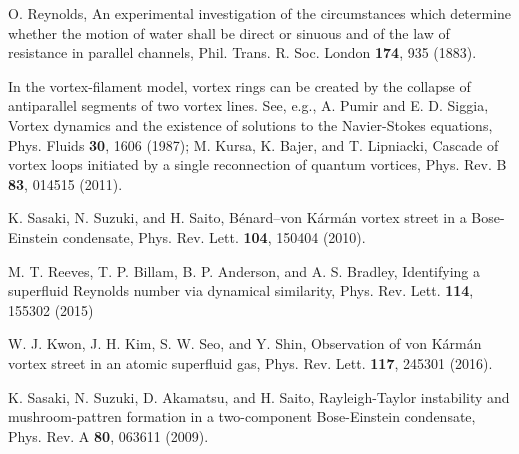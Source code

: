 \documentclass[12pt,a4paper]{jbook}
\begin{document}
\begin{thebibliography}{99}

		O. Reynolds,
		An experimental investigation of the circumstances which determine
		whether the motion of water shall be direct or sinuous
		and of the law of resistance in parallel channels,
		Phil. Trans. R. Soc. London \textbf{174}, 935 (1883).

		In the vortex-filament model, vortex rings can be created by the collapse of 
		antiparallel segments of two vortex lines. See, e.g., A. Pumir and E. D. Siggia,
		Vortex dynamics and the existence of solutions to the Navier-Stokes equations,
		Phys. Fluids \textbf{30}, 1606 (1987); M. Kursa, K. Bajer, and T. Lipniacki, 
		Cascade of vortex loops initiated by a single reconnection of quantum vortices, 
		Phys. Rev. B \textbf{83}, 014515 (2011).

		K. Sasaki, N. Suzuki, and H. Saito,
		B\'enard--von K\'arm\'an vortex street in a Bose-Einstein condensate,
		Phys. Rev. Lett. \textbf{104}, 150404 (2010).

		M. T. Reeves, T. P. Billam, B. P. Anderson, and A. S. Bradley,
		Identifying a superfluid Reynolds number via dynamical similarity,
		Phys. Rev. Lett. \textbf{114}, 155302 (2015)

		W. J. Kwon, J. H. Kim, S. W. Seo, and Y. Shin,
		Observation of von K\'arm\'an vortex street in an atomic superfluid gas,
		Phys. Rev. Lett. \textbf{117}, 245301 (2016).

		K. Sasaki, N. Suzuki, D. Akamatsu, and H. Saito,
		Rayleigh-Taylor instability and mushroom-pattren formation
		in a two-component Bose-Einstein condensate,
		Phys. Rev. A \textbf{80}, 063611 (2009).


\end{thebibliography}
\end{document}
